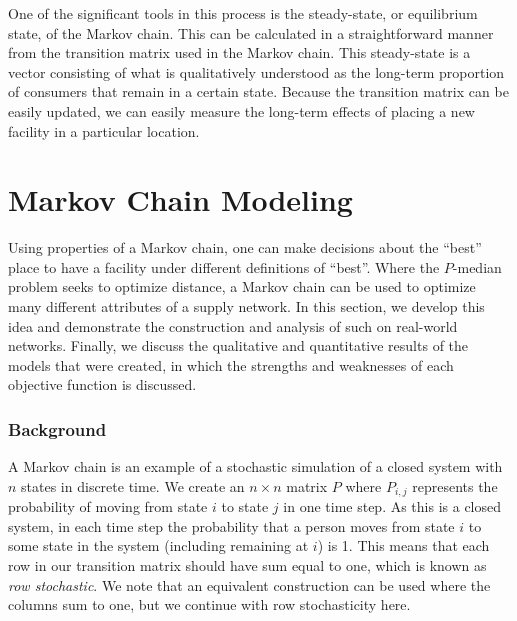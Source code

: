 \documentclass[twoside,twocolumn]{article}
\begin{document}
One of the significant tools in this process is the steady-state, or equilibrium state, of the Markov chain.
This can be calculated in a straightforward manner from the transition matrix used in the Markov chain.
This steady-state is a vector consisting of what is qualitatively understood as the long-term proportion of consumers that remain in a certain state. %
Because the transition matrix can be easily updated, we can easily measure the long-term effects of placing a new facility in a particular location.

\section{Markov Chain Modeling}

Using properties of a Markov chain, one can make decisions about the ``best'' place to have a facility under different definitions of ``best''.
Where the $P$-median problem seeks to optimize distance, a Markov chain can be used to optimize many different attributes of a supply network.
In this section, we develop this idea and demonstrate the construction and analysis of such on real-world networks.
Finally, we discuss the qualitative and quantitative results of the models that were created, in which the strengths and weaknesses of each objective function is discussed.

\subsubsection{Background}

A Markov chain is an example of a stochastic simulation of a closed system with $n$ states in discrete time.
We create an $n\times n$ matrix $P$ where $P_{i,j}$ represents the probability of moving from state $i$ to state $j$ in one time step.
As this is a closed system, in each time step the probability that a person moves from state $i$ to some state in the system (including remaining at $i$) is 1. 
This means that each row in our transition matrix should have sum equal to one, which is known as {\em row stochastic}.
We note that an equivalent construction can be used where the columns sum to one, but we continue with row stochasticity here.%
\end{document}
